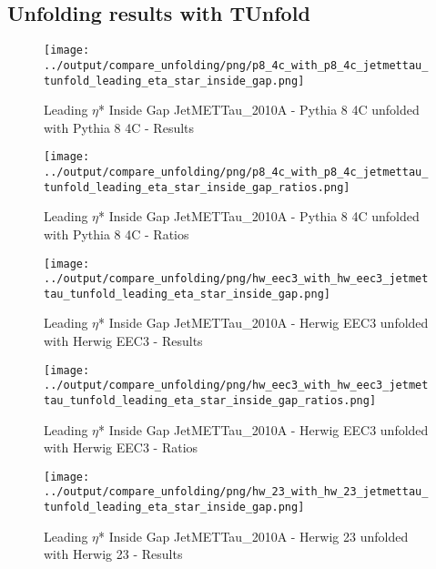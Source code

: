 \documentclass[11pt]{book}
\begin{document}
\clearpage
\subsection{Unfolding results with TUnfold}


\begin{figure}[ht]
\centering
\texttt{[image: ../output/compare\_unfolding/png/p8\_4c\_with\_p8\_4c\_jetmettau\_tunfold\_leading\_eta\_star\_inside\_gap.png]}
\caption{Leading $\eta$* Inside Gap JetMETTau\_2010A - Pythia 8 4C unfolded with Pythia 8 4C - Results}
\label{p8_p8_jetmettau_tunfold_leading_eta_star_inside_gap_a}
\end{figure}

\begin{figure}[ht]
\centering
\texttt{[image: ../output/compare\_unfolding/png/p8\_4c\_with\_p8\_4c\_jetmettau\_tunfold\_leading\_eta\_star\_inside\_gap\_ratios.png]}
\caption{Leading $\eta$* Inside Gap JetMETTau\_2010A - Pythia 8 4C unfolded with Pythia 8 4C - Ratios}
\label{p8_p8_jetmettau_tunfold_leading_eta_star_inside_gap_b}
\end{figure}

\begin{figure}[ht]
\centering
\texttt{[image: ../output/compare\_unfolding/png/hw\_eec3\_with\_hw\_eec3\_jetmettau\_tunfold\_leading\_eta\_star\_inside\_gap.png]}
\caption{Leading $\eta$* Inside Gap JetMETTau\_2010A - Herwig EEC3 unfolded with Herwig EEC3 - Results}
\label{hw_eec3_hw_eec3_jetmettau_tunfold_leading_eta_star_inside_gap_a}
\end{figure}

\begin{figure}[ht]
\centering
\texttt{[image: ../output/compare\_unfolding/png/hw\_eec3\_with\_hw\_eec3\_jetmettau\_tunfold\_leading\_eta\_star\_inside\_gap\_ratios.png]}
\caption{Leading $\eta$* Inside Gap JetMETTau\_2010A - Herwig EEC3 unfolded with Herwig EEC3 - Ratios}
\label{hw_eec3_hw_eec3_jetmettau_tunfold_leading_eta_star_inside_gap_b}
\end{figure}

\begin{figure}[ht]
\centering
\texttt{[image: ../output/compare\_unfolding/png/hw\_23\_with\_hw\_23\_jetmettau\_tunfold\_leading\_eta\_star\_inside\_gap.png]}
\caption{Leading $\eta$* Inside Gap JetMETTau\_2010A - Herwig 23 unfolded with Herwig 23 - Results}
\label{hw_23_hw_23_jetmettau_tunfold_leading_eta_star_inside_gap_a}
\end{figure}
\end{document}
